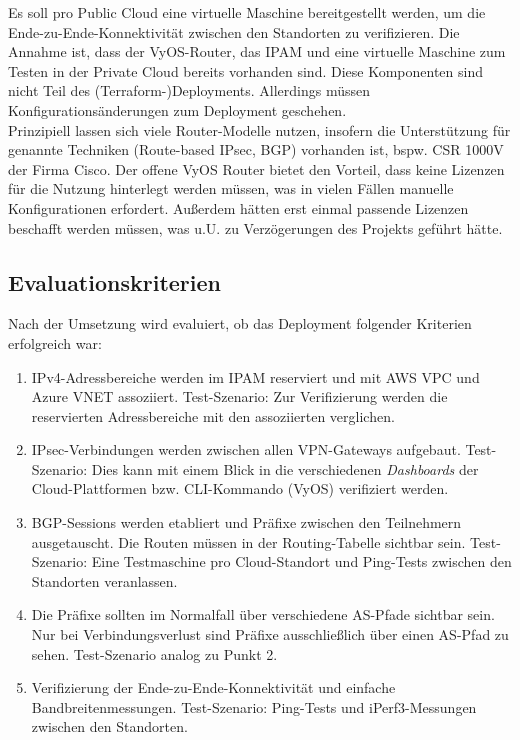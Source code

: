 Es soll pro Public Cloud eine virtuelle Maschine bereitgestellt werden, um die Ende-zu-Ende-Konnektivität zwischen den Standorten zu verifizieren.
Die Annahme ist, dass der VyOS-Router, das IPAM und eine virtuelle Maschine zum Testen in der Private Cloud bereits vorhanden sind. Diese Komponenten sind nicht Teil des (Terraform-)Deployments. Allerdings müssen Konfigurationsänderungen zum \gls{Deployment} geschehen.\\
Prinzipiell lassen sich viele Router-Modelle nutzen, insofern die Unterstützung für genannte Techniken (Route-based IPsec, BGP) vorhanden ist, bspw. CSR 1000V der Firma Cisco\cite{Durai2016}. Der offene VyOS Router bietet den Vorteil, dass keine Lizenzen für die Nutzung hinterlegt werden müssen, was in vielen Fällen manuelle Konfigurationen erfordert. Außerdem hätten erst einmal passende Lizenzen beschafft werden müssen, was u.U. zu Verzögerungen des Projekts geführt hätte.
\subsection{Evaluationskriterien}\label{eval-kriterien-uc1}
Nach der Umsetzung wird evaluiert, ob das \gls{Deployment} folgender Kriterien erfolgreich war:
\begin{enumerate}
    \item IPv4-Adressbereiche werden im IPAM reserviert und mit AWS VPC und Azure VNET assoziiert. Test-Szenario: Zur Verifizierung werden die reservierten Adressbereiche mit den assoziierten verglichen.
    \item IPsec-Verbindungen werden zwischen allen \gls{VPN-Gateway}s aufgebaut. Test-Szenario: Dies kann mit einem Blick in die verschiedenen \textit{Dashboards} der Cloud-Plattformen bzw. CLI-Kommando (VyOS) verifiziert werden.
    \item BGP-Sessions werden etabliert und Präfixe zwischen den Teilnehmern ausgetauscht. Die Routen müssen in der Routing-Tabelle sichtbar sein. Test-Szenario: Eine Testmaschine pro Cloud-Standort und Ping-Tests zwischen den Standorten veranlassen.
    \item Die Präfixe sollten im Normalfall über verschiedene AS-Pfade sichtbar sein. Nur bei Verbindungsverlust sind Präfixe ausschließlich über einen AS-Pfad zu sehen. Test-Szenario analog zu Punkt 2.
    \item Verifizierung der Ende-zu-Ende-Konnektivität und einfache Bandbreitenmessungen. Test-Szenario: Ping-Tests und iPerf3-Messungen zwischen den Standorten.
\end{enumerate}
